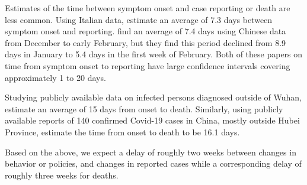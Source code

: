 \documentclass[3p, longtitle]{elsarticle}
\theoremstyle{definition}
\def\ycolor{\color{red}}
\begin{document}
Estimates of the time between symptom onset and case reporting or death
are less common. Using Italian data, \cite{cereda2020} estimate an
average of 7.3 days between symptom onset and
reporting. \cite{zhang2020} find an average of 7.4 days using Chinese data
from December to early February, but they find this period declined
from 8.9 days in January to 5.4 days in the first week of
February. Both of these papers on time from symptom onset to reporting
have large confidence intervals covering approximately 1 to 20 days.

Studying publicly available data on infected persons diagnosed outside of Wuhan,
\cite{linton2020}  estimate an average of 15 days  from  onset to death. Similarly, using publicly available reports of 140 confirmed Covid-19 cases in China, mostly outside Hubei Province, \cite{sanche2020} estimate the time from onset to death to be  16.1 days.

Based on the above, we expect a delay of roughly two weeks between
changes in behavior or policies, and changes in reported
cases while a corresponding delay of roughly three weeks for deaths.

\end{document}
